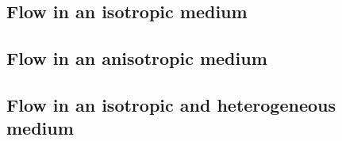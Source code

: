 


\subsection{Flow in an isotropic medium}



\subsection{Flow in an anisotropic medium}



\subsection{Flow in an isotropic and heterogeneous medium}

